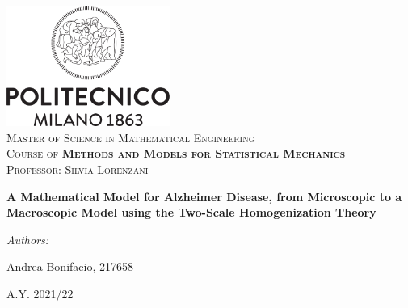 \documentclass{article}
\theoremstyle{definition}
\theoremstyle{remark}
\begin{document}
\begin{titlepage}
\vbox{ }
\begin{center}
\includegraphics[width=0.40\textwidth]{Logo_Politecnico_Milano.png}\\[1cm]
\textsc{\Large Master of Science in Mathematical Engineering}\\[0.5cm]

\textsc{\Large Course of \textbf{Methods and Models for Statistical Mechanics}\\Professor: Silvia Lorenzani}
\large

\vbox{ }

\vspace{2 cm}
        \LARGE
        \textbf{A Mathematical Model for Alzheimer Disease, from Microscopic to a Macroscopic Model using the Two-Scale Homogenization Theory}
            

\vspace{1 cm}
\large
\emph{Authors:}\\
\bigskip

Andrea Bonifacio, 217658 \hspace{5.3cm} \\
 
\vfill

{\large A.Y. 2021/22}
\end{center}
\end{titlepage}
\tableofcontents
\newpage
\end{document}
